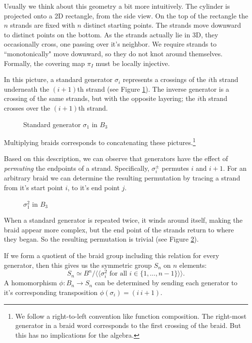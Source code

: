 \documentclass[12pt]{thesis}
\begin{document}
Usually we think about this geometry a bit more intuitively.
The cylinder is projected onto a 2D 
rectangle, from the side view.
On the top of the rectangle
the $n$ strands are fixed with $n$ distinct starting points.
The strands move downward
to distinct points on the bottom.
As the strands actually lie in 3D,
they occasionally cross, one passing over it's neighbor.
We require strands to ``monotonically" move downward,
so they do not knot around themselves.
Formally, the covering map $\pi_{I}$ must be locally injective.

In this picture,
a standard generator $\sigma_{i}$ represents a crossings of the $i$th strand
underneath the $(i + 1)$th strand (see Figure \ref{fig:standard-generator}).
The inverse generator is a crossing of the same strands, but with the opposite layering;
the $i$th strand crosses over the $(i + 1)$th strand.
\begin{figure}[h]
    \centering
    \def\svgwidth{4cm}
    
    \caption{Standard generator $\sigma_{1}$ in $B_{3}$}
    \label{fig:standard-generator}
\end{figure}
Multiplying braids corresponds to concatenating these pictures.\footnote{We follow a right-to-left convention like function composition. The right-most generator
in a braid word corresponds to the first crossing of the braid.
But this has no implications for the algebra.}

Based on this description, we can observe that generators
have the effect of \textit{permuting} the endpoints of a strand.
Specifically, $\sigma_{i}^{\pm}$ permutes $i$ and $i+1$.
For an arbitrary braid we can determine
the resulting permutation by tracing a strand from it's start point $i$, to it's end point $j$.

\begin{figure}[h]
    \centering
    \def\svgwidth{4cm}
    
    \caption{$\sigma_{1}^{2}$ in $B_{3}$}
    \label{fig:generator-squared}
\end{figure}

When a standard generator is repeated twice, it winds around
itself, making the braid appear more complex,
but the end point of the strands return to where they began.
So the resulting  permutation is trivial
(see Figure \ref{fig:generator-squared}).

If we form a quotient of the braid group including this relation for every generator, then this gives us the symmetric
group $S_{n}$ on $n$ elements:
\begin{equation}
S_{n} \simeq B^{n} / \langle \langle \sigma_{i}^{2} \text{ for all } i \in \{ 1, \ldots, n-1 \}  \rangle \rangle.
\end{equation}
A homomorphism $\phi \colon B_{n} \rightarrow S_{n}$ can be determined by 
sending each generator to it's corresponding transposition $\phi(\sigma_{i}) = (i\ i+1)$.
\end{document}

